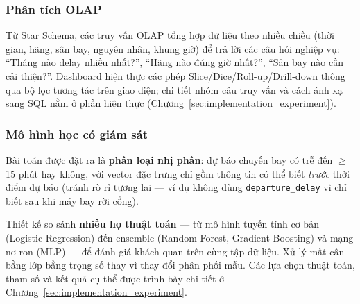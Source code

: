 \subsubsection{Phân tích OLAP}

Từ Star Schema, các truy vấn OLAP tổng hợp dữ liệu theo nhiều chiều
(thời gian, hãng, sân bay, nguyên nhân, khung giờ) để trả lời
các câu hỏi nghiệp vụ: ``Tháng nào delay nhiều nhất?'',
``Hãng nào đúng giờ nhất?'', ``Sân bay nào cần cải thiện?''.
Dashboard hiện thực các phép Slice/Dice/Roll-up/Drill-down
thông qua bộ lọc tương tác trên giao diện;
chi tiết nhóm câu truy vấn và cách ánh xạ sang SQL
nằm ở phần hiện thực (Chương~\ref{sec:implementation_experiment}).

\subsubsection{Mô hình học có giám sát}

Bài toán được đặt ra là \textbf{phân loại nhị phân}:
dự báo chuyến bay có trễ đến $\geq$ 15 phút hay không,
với vector đặc trưng chỉ gồm thông tin có thể biết \textit{trước} thời điểm dự báo
(tránh rò rỉ tương lai --- ví dụ không dùng \texttt{departure\_delay}
vì chỉ biết sau khi máy bay rời cổng).

Thiết kế so sánh \textbf{nhiều họ thuật toán} ---
từ mô hình tuyến tính cơ bản (Logistic Regression) đến ensemble (Random Forest, Gradient Boosting)
và mạng nơ-ron (MLP) --- để đánh giá khách quan trên cùng tập dữ liệu.
Xử lý mất cân bằng lớp bằng trọng số thay vì thay đổi phân phối mẫu.
Các lựa chọn thuật toán, tham số và kết quả cụ thể
được trình bày chi tiết ở Chương~\ref{sec:implementation_experiment}.

